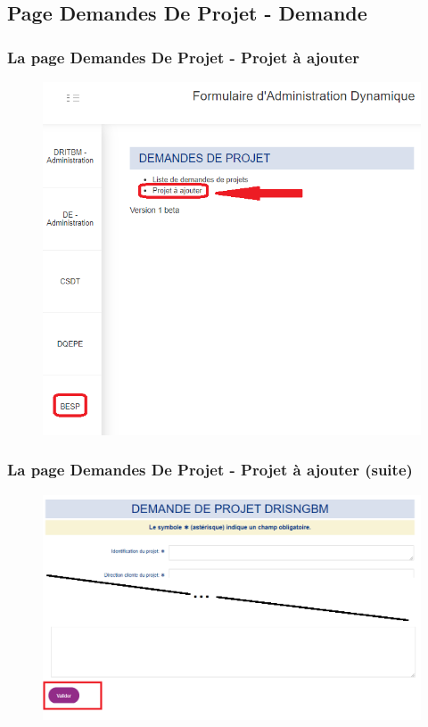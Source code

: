 \documentclass[aspectratio=169]{beamer}%
\begin{document}
\subsection{Page Demandes De Projet - Demande}
\begin{frame}
\transwipe 
\label{pictures}
\frametitle{La page Demandes De Projet - Projet à ajouter}

\begin{figure}
\includegraphics[scale=0.33]{home_list2}
\end{figure}
\end{frame}

\begin{frame}
\transwipe 
\label{pictures}
\frametitle{La page Demandes De Projet - Projet à ajouter (suite)}

\begin{figure}
\includegraphics[scale=0.33]{form_valider}
\end{figure}
\end{frame}
\end{document}
